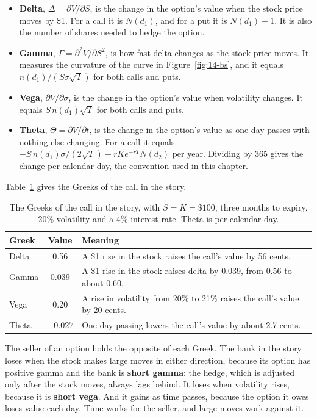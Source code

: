 \begin{itemize}
  \item \textbf{Delta}, $\Delta = \partial V/\partial S$, is the change in the option's value when the stock price moves by \$1. For a call it is $N(d_1)$, and for a put it is $N(d_1) - 1$. It is also the number of shares needed to hedge the option.
  \item \textbf{Gamma}, $\Gamma = \partial^2 V/\partial S^2$, is how fast delta changes as the stock price moves. It measures the curvature of the curve in Figure~\ref{fig:14-bs}, and it equals $n(d_1)/(S\sigma\sqrt{T})$ for both calls and puts.
  \item \textbf{Vega}, $\partial V/\partial \sigma$, is the change in the option's value when volatility changes. It equals $S\,n(d_1)\sqrt{T}$ for both calls and puts.
  \item \textbf{Theta}, $\Theta = \partial V/\partial t$, is the change in the option's value as one day passes with nothing else changing. For a call it equals $-S\,n(d_1)\sigma/(2\sqrt{T}) - rKe^{-rT}N(d_2)$ per year. Dividing by 365 gives the change per calendar day, the convention used in this chapter.
\end{itemize}

Table~\ref{tab:14-greeks} gives the Greeks of the call in the story.

\begin{table}[htbp]
\centering
\caption{The Greeks of the call in the story, with $S = K = \$100$, three months to expiry, 20\% volatility and a 4\% interest rate. Theta is per calendar day.}
\label{tab:14-greeks}
\begin{tabular}{@{}lcl@{}}
\toprule
Greek & Value & Meaning \\
\midrule
Delta & 0.56   & A \$1 rise in the stock raises the call's value by 56 cents. \\
Gamma & 0.039  & A \$1 rise in the stock raises delta by 0.039, from 0.56 to about 0.60. \\
Vega  & 0.20   & A rise in volatility from 20\% to 21\% raises the call's value by 20 cents. \\
Theta & $-0.027$ & One day passing lowers the call's value by about 2.7 cents. \\
\bottomrule
\end{tabular}
\end{table}

The seller of an option holds the opposite of each Greek. The bank in the story loses when the stock makes large moves in either direction, because its option has positive gamma and the bank is \textbf{short gamma}: the hedge, which is adjusted only after the stock moves, always lags behind. It loses when volatility rises, because it is \textbf{short vega}. And it gains as time passes, because the option it owes loses value each day. Time works for the seller, and large moves work against it.

